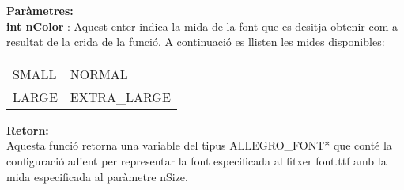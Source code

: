 \documentclass[11pt]{article}
\begin{document}
\noindent \textbf{Paràmetres:}\\
\textbf{int nColor} : Aquest enter indica la mida de la font que es desitja obtenir com a resultat de la crida de la funció. A continuació es llisten les mides disponibles:

\begin{center}
	\begin{tabular}{l|l}
		SMALL & NORMAL\\
		LARGE & EXTRA\_LARGE\\	
	\end{tabular}
\end{center}

\noindent \textbf{Retorn:}\\
Aquesta funció retorna una variable del tipus ALLEGRO\_FONT* que conté la configuració adient per representar la font especificada al fitxer font.ttf amb la mida especificada al paràmetre nSize.
   	
\end{document}

